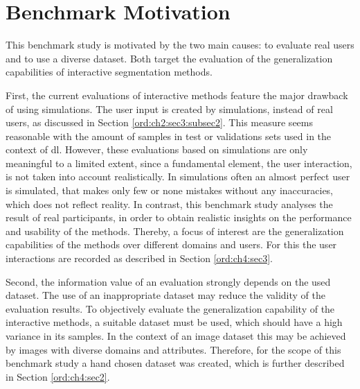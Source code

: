 
\section{Benchmark Motivation}\label{ord:ch4:sec1}

This benchmark study is motivated by the two main causes: to evaluate real users and to use a diverse dataset.
Both target the evaluation of the generalization capabilities of interactive segmentation methods.

First, the current evaluations of interactive methods feature the major drawback of using simulations.
The user input is created by simulations, instead of real users, as discussed in Section \ref{ord:ch2:sec3:subsec2}.
This measure seems reasonable with the amount of samples in test or validations sets used in the context of \gls{dl}.
However, these evaluations based on simulations are only meaningful to a limited extent, since a fundamental element, the user interaction, is not taken into account realistically.
In simulations often an almost perfect user is simulated, that makes only few or none mistakes without any inaccuracies, which does not reflect reality.
In contrast, this benchmark study analyses the result of real participants, in order to obtain realistic insights on the performance and usability of the methods.
Thereby, a focus of interest are the generalization capabilities of the methods over different domains and users. 
For this the user interactions are recorded as described in Section \ref{ord:ch4:sec3}.

Second, the information value of an evaluation strongly depends on the used dataset.
The use of an inappropriate dataset may reduce the validity of the evaluation results.
To objectively evaluate the generalization capability of the interactive methods, a suitable dataset must be used, which should have a high variance in its samples.
In the context of an image dataset this may be achieved by images with diverse domains and attributes.
Therefore, for the scope of this benchmark study a hand chosen dataset was created, which is further described in Section \ref{ord:ch4:sec2}.
